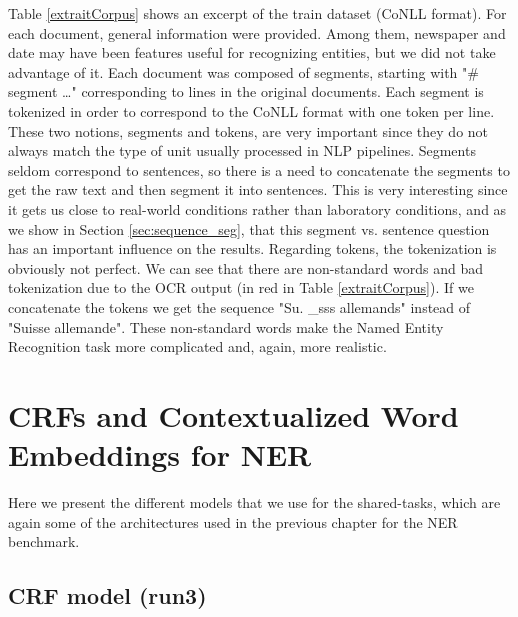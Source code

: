 Table \ref{extraitCorpus} shows an excerpt of the train dataset (CoNLL format). For each document, general information were provided. Among them, newspaper and date may have been features useful for recognizing entities, but we did not take advantage of it. Each document was composed of segments, starting with "\# segment \dots" corresponding to lines in the original documents. Each segment is tokenized in order to correspond to the CoNLL format with one token per line. These two notions, segments and tokens, are very important since they do not always match the type of unit usually processed in NLP pipelines. Segments seldom correspond to sentences, so there is a need to concatenate the segments to get the raw text and then segment it into sentences. This is very interesting since it gets us close to real-world conditions rather than laboratory conditions, and as we show in Section \ref{sec:sequence_seg}, that this segment vs. sentence question has an important influence on the results. Regarding tokens, the tokenization is obviously not perfect. We can see that there are non-standard words and bad tokenization due to the OCR output (in red in Table \ref{extraitCorpus}). If we concatenate the tokens we get the sequence "Su. \_sss allemands" instead of "Suisse allemande". These non-standard words make the Named Entity Recognition task more complicated and, again, more realistic.

\section{CRFs and Contextualized Word Embeddings for NER}
\label{sec:method}

Here we present the different models that we use for the shared-tasks, which are again some of the architectures used in the previous chapter for the NER benchmark.

\subsection{CRF model (run3)}

